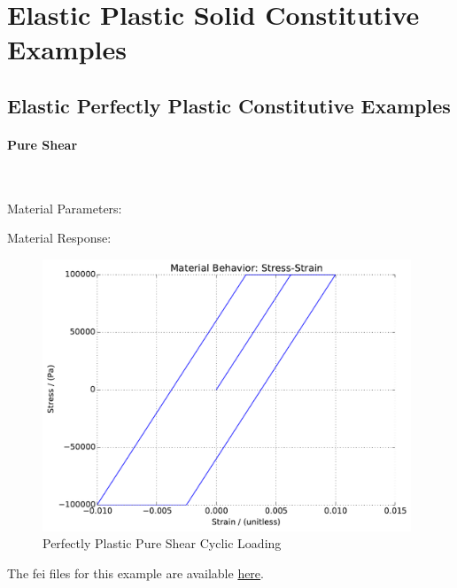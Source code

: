\documentclass[fleqn,11pt]{article}
\begin{document}
\section{Elastic Plastic Solid Constitutive Examples}
\label{section_elastoplastic_constitutive_example}
\subsection{Elastic Perfectly Plastic Constitutive Examples}


\paragraph{Pure Shear} ~

Material Parameters:


Material Response:
\begin{figure}[H]
\begin{center}
\includegraphics[width=11cm]{../fei_examples/perfectly_plastic/2pure_shear_cyclic_loading/result.pdf}
\caption{
\label{Perfectly Plastic Pure Shear Cyclic}
Perfectly Plastic Pure Shear Cyclic Loading}
\end{center}
\end{figure}

The fei files for this example are available \href{https://github.com/yuan-energy/education_examples/tree/master/fei_examples/perfectly_plastic/2pure_shear_cyclic_loading}{here}.

\newpage
\end{document}
